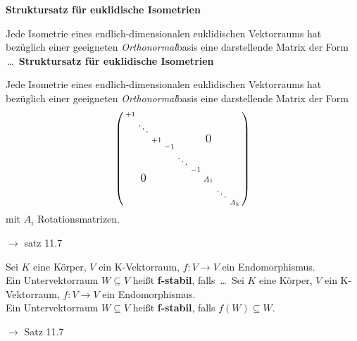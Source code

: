 \documentclass[11pt]{article}
\renewcommand{\cite}[1]{\par\bigskip\hfill{\color{gray}\tiny\(\to\) #1}}
\let\olddots\dots
\renewcommand{\dots}{\,\olddots\,}
\newenvironment{field}{}{\newpage}
\newif\ifnote
\newenvironment{note}{\notetrue}{\notefalse}
\newcommand{\localtag}{}
\newcommand{\globaltag}{}
\newcommand{\uuid}{}
\newcommand{\tags}[1]{
    \ifnote
        \renewcommand{\localtag}{#1}
    \else
        \renewcommand{\globaltag}{#1}
    \fi
    }
\newcommand{\xplain}[1]{\renewcommand{\uuid}{#1}}
\begin{document}
\begin{note}
    \begin{field}
        \textbf{Struktursatz für euklidische Isometrien}

        Jede Isometrie eines endlich-dimensionalen euklidischen Vektorraums hat bezüglich einer geeigneten \emph{Orthonormal}basis eine darstellende Matrix der Form \dots
    \end{field}
    \begin{field}
        \textbf{Struktursatz für euklidische Isometrien}

        Jede Isometrie eines endlich-dimensionalen euklidischen Vektorraums hat bezüglich einer geeigneten \emph{Orthonormal}basis eine darstellende Matrix der Form
        \[\left(\begin{smallmatrix}
            +1 \\
              & \ddots \\
              &        & +1 &  &       &  &     \mbox{\large 0}\\
              &        &    &-1\\
              &        &    &  &\ddots\\
              &        &    &  &       &-1\\
              &\mbox{\large 0}&    &  &       &  & A_1\\
              &        &    &  &       &  &     &\ddots\\
              &        &    &  &       &  &     &       & A_k\\
        \end{smallmatrix}\right)\]
        mit \(A_i\) Rotationsmatrizen. \cite{satz 11.7}
    \end{field}
\end{note}

\begin{note}
    \tags{Def}
    \xplain{b9b834fe-c30d-11ec-9d64-0242ac120002}

    \begin{field}
        Sei \(K\) eine Körper, \(V\) ein K-Vektorraum, \(f\colon V\rightarrow V\) ein Endomorphismus.\\
        Ein Untervektorraum \(W \subseteq V\) heißt \textbf{f-stabil}, falls \dots
    \end{field}
    \begin{field}
        Sei \(K\) eine Körper, \(V\) ein K-Vektorraum, \(f\colon V\rightarrow V\) ein Endomorphismus.\\
        Ein Untervektorraum \(W \subseteq V\) heißt \textbf{f-stabil}, falls $f(W)\subseteq W$.
        \cite{Satz 11.7}
    \end{field}
\end{note}
\end{document}
